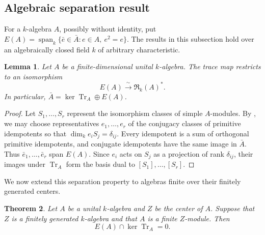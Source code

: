 \documentclass[11pt,letterpaper]{amsart}
\newtheorem{theorem}{Theorem}
\newtheorem{lemma}[theorem]{Lemma}
\theoremstyle{definition}
\numberwithin{equation}{section}
\numberwithin{theorem}{section}
\newcommand{\kk}{k}
\newcommand{\cR}{\mathfrak R}
\DeclareMathOperator{\Tr}{Tr}
\DeclareMathOperator{\spanop}{span}
\begin{document}
\subsection{Algebraic separation result}
\label{subsec:algebraic-separation}
For a $\kk$-algebra $A$, possibly without identity, put
$E(A)=\spanop_\kk\{\bar e\in\bar A:e\in A,\ e^2=e\}$.
The results in this subsection hold over an algebraically
closed field $\kk$ of arbitrary characteristic.

\begin{lemma}\label{lem:finite}
Let $A$ be a finite-dimensional unital $\kk$-algebra.
The trace map restricts to an isomorphism
\[
 E(A)\xrightarrow{\ \sim\ }\cR_\kk(A)^*.
\]
In particular, $\bar A=\ker\Tr_{A}\oplus E(A)$.
\end{lemma}

\begin{proof}
Let $S_1,\ldots,S_r$ represent the isomorphism classes of
simple $A$-modules. By \cite[Theorem~9.2.1 and its proof]{EtingofEtAl},
we may choose representatives $e_1,\ldots,e_r$ of the conjugacy
classes of primitive idempotents so that $\dim_\kk e_iS_j=\delta_{ij}$.
Every idempotent is a sum of orthogonal primitive idempotents,
and conjugate idempotents have the same image in $\bar A$.
Thus $\bar e_1,\ldots,\bar e_r$ span $E(A)$.
Since $e_i$ acts on $S_j$ as a projection of rank $\delta_{ij}$,
their images under $\Tr_A$ form the basis dual to $[S_1],\ldots,[S_r]$.
\end{proof}

We now extend this separation property to algebras finite over their finitely generated centers.

\begin{theorem}\label{thm:separation}
Let $A$ be a unital $\kk$-algebra and $Z$ be the center of $A$.
Suppose that $Z$ is a finitely generated $\kk$-algebra
and that $A$ is a finite $Z$-module. Then
\[
 E(A)\cap\ker\Tr_A=0.
\]
\end{theorem}
\end{document}
